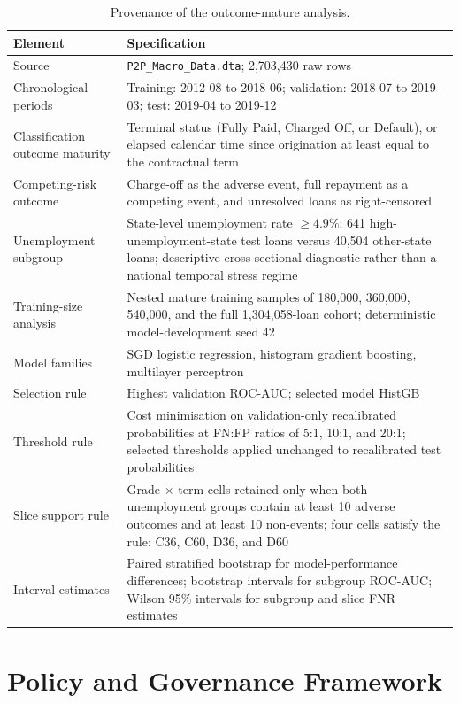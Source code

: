 \documentclass[10pt]{article}
\begin{document}
\begin{table}[!ht]
\centering
\caption{Provenance of the outcome-mature analysis.}
\label{tab:reanalysis_manifest}
\begin{tabular}{L{4.2cm}L{9.8cm}}
\toprule
Element & Specification \\
\midrule
Source & \texttt{P2P\_Macro\_Data.dta}; 2,703,430 raw rows \\
Chronological periods & Training: 2012-08 to 2018-06; validation: 2018-07 to 2019-03; test: 2019-04 to 2019-12 \\
Classification outcome maturity & Terminal status (Fully Paid, Charged Off, or Default), or elapsed calendar time since origination at least equal to the contractual term \\ Competing-risk outcome & Charge-off as the adverse event, full repayment as a competing event, and unresolved loans as right-censored \\
Unemployment subgroup & State-level unemployment rate $\geq 4.9\%$; 641 high-unemployment-state test loans versus 40,504 other-state loans; descriptive cross-sectional diagnostic rather than a national temporal stress regime \\
Training-size analysis & Nested mature training samples of 180,000, 360,000, 540,000, and the full 1,304,058-loan cohort; deterministic model-development seed 42 \\
Model families & SGD logistic regression, histogram gradient boosting, multilayer perceptron \\
Selection rule & Highest validation ROC-AUC; selected model HistGB \\
Threshold rule & Cost minimisation on validation-only recalibrated probabilities at FN:FP ratios of 5:1, 10:1, and 20:1; selected thresholds applied unchanged to recalibrated test probabilities \\
Slice support rule & Grade $\times$ term cells retained only when both unemployment groups contain at least 10 adverse outcomes and at least 10 non-events; four cells satisfy the rule: C36, C60, D36, and D60 \\
Interval estimates & Paired stratified bootstrap for model-performance differences; bootstrap intervals for subgroup ROC-AUC; Wilson 95\% intervals for subgroup and slice FNR estimates \\
\bottomrule
\end{tabular}
\end{table}

\section{Policy and Governance Framework}
\label{sec:policy}
\end{document}
